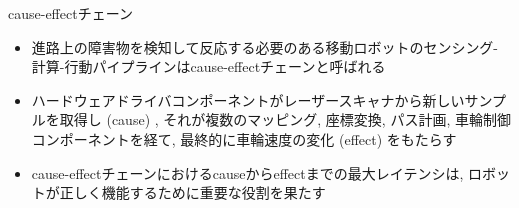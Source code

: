 
\begin{frame}{cause-effectチェーン}
    \begin{itemize}
        \item 進路上の障害物を検知して反応する必要のある移動ロボットのセンシング-計算-行動パイプラインはcause-effectチェーンと呼ばれる
        \item ハードウェアドライバコンポーネントがレーザースキャナから新しいサンプルを取得し (cause) , それが複数のマッピング, 座標変換, パス計画, 車輪制御コンポーネントを経て, 最終的に車輪速度の変化 (effect) をもたらす
        \item cause-effectチェーンにおけるcauseからeffectまでの最大レイテンシは, ロボットが正しく機能するために重要な役割を果たす
    \end{itemize}
\end{frame}




